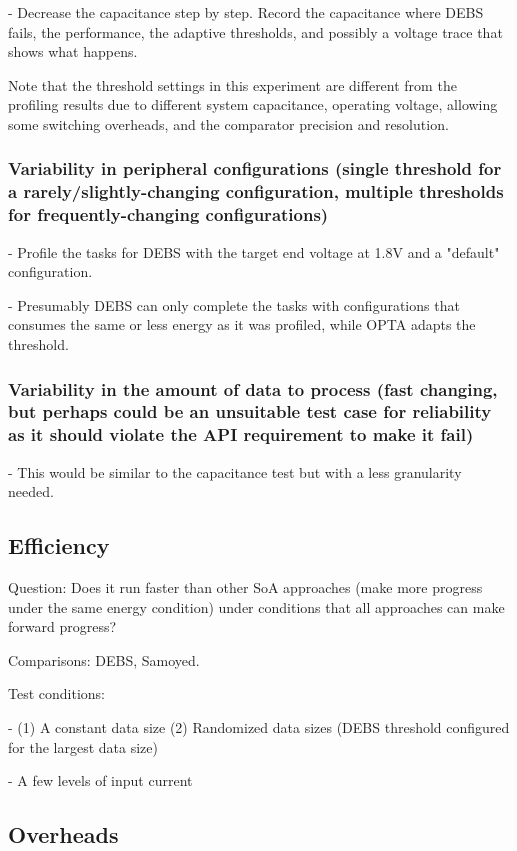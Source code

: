 - Decrease the capacitance step by step. Record the capacitance where DEBS fails, the performance, the adaptive thresholds, and possibly a voltage trace that shows what happens. 

Note that the threshold settings in this experiment are different from the profiling results due to different system capacitance, operating voltage, allowing some switching overheads, and the comparator precision and resolution. 

\subsubsection{Variability in peripheral configurations (single threshold for a rarely/slightly-changing configuration, multiple thresholds for frequently-changing configurations)}

- Profile the tasks for DEBS with the target end voltage at 1.8V and a "default" configuration. 
    
- Presumably DEBS can only complete the tasks with configurations that consumes the same or less energy as it was profiled, while OPTA adapts the threshold. 

\subsubsection{Variability in the amount of data to process (fast changing, but perhaps could be an unsuitable test case for reliability as it should violate the API requirement to make it fail)}
    
- This would be similar to the capacitance test but with a less granularity needed.

\subsection{Efficiency}

Question: Does it run faster than other SoA approaches (make more progress under the same energy condition) under conditions that all approaches can make forward progress?

Comparisons: DEBS, Samoyed.

Test conditions:
    
- (1) A constant data size (2) Randomized data sizes (DEBS threshold configured for the largest data size)

- A few levels of input current

\subsection{Overheads}

